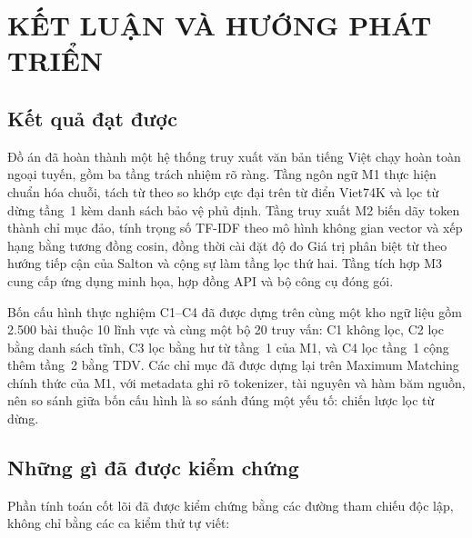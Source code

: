 \chapter{KẾT LUẬN VÀ HƯỚNG PHÁT TRIỂN}
\label{ch:ch5-ketluan}

\section{Kết quả đạt được}

Đồ án đã hoàn thành một hệ thống truy xuất văn bản tiếng Việt chạy hoàn toàn ngoại
tuyến, gồm ba tầng trách nhiệm rõ ràng. Tầng ngôn ngữ M1 thực hiện chuẩn hóa chuỗi,
tách từ theo so khớp cực đại trên từ điển Viet74K \cite{viet74k} và lọc từ dừng
tầng~1 kèm danh sách bảo vệ phủ định. Tầng truy xuất M2 biến dãy token thành chỉ
mục đảo, tính trọng số TF-IDF theo mô hình không gian vector \cite{salton1975vsm}
và xếp hạng bằng tương đồng cosin, đồng thời cài đặt độ đo Giá trị phân biệt từ
theo hướng tiếp cận của Salton và cộng sự \cite{salton1975theory} làm tầng lọc thứ
hai. Tầng tích hợp M3 cung cấp ứng dụng minh họa, hợp đồng API và bộ công cụ đóng
gói.

Bốn cấu hình thực nghiệm C1--C4 đã được dựng trên cùng một kho ngữ liệu gồm 2.500
bài thuộc 10 lĩnh vực và cùng một bộ 20 truy vấn: C1 không lọc, C2 lọc bằng danh
sách tĩnh, C3 lọc bằng hư từ tầng~1 của M1, và C4 lọc tầng~1 cộng thêm tầng~2 bằng
TDV. Các chỉ mục đã được dựng lại trên Maximum Matching chính thức của M1, với
metadata ghi rõ tokenizer, tài nguyên và hàm băm nguồn, nên so sánh giữa bốn cấu
hình là so sánh đúng một yếu tố: chiến lược lọc từ dừng.

\section{Những gì đã được kiểm chứng}

Phần tính toán cốt lõi đã được kiểm chứng bằng các đường tham chiếu độc lập, không
chỉ bằng các ca kiểm thử tự viết:

